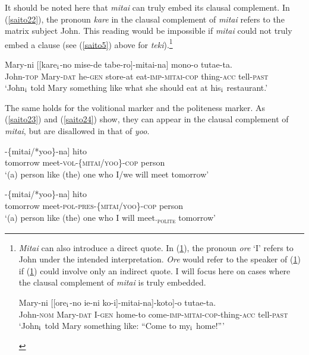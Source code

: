 \documentclass[output=paper]{langscibook}
\begin{document}
It should be noted here that \emph{mitai} can truly embed its clausal complement. In (\ref{saito22}), the pronoun \emph{kare} in the clausal complement of \emph{mitai} refers to the matrix subject John. This reading would be impossible if \emph{mitai} could not truly embed a clause  (see (\ref{saito5}) above for \emph{teki}).\footnote{\emph{Mitai} can also introduce a direct quote. In (\ref{saitoi2}), the pronoun \emph{ore} ‘I’ refers to John under the intended interpretation. \emph{Ore} would refer to the speaker of (\ref{saitoi2}) if (\ref{saitoi2}) could involve only an indirect quote. I will focus here on cases where the clausal complement of \emph{mitai} is truly embedded. 
\begin{exe}
\ex \label{saitoi2}
  {Mary-ni} [[{ore$_{\textnormal{i}}$-no} {ie-ni} {ko-i}]-{mitai-na]-koto]-o} {tutae-ta}.\\
John-\textsc{nom} Mary-\textsc{dat} I-\textsc{gen} home-to come-\textsc{imp-mitai-cop}-thing-\textsc{acc} tell-\textsc{past}\\ 
\glt ‘John$_{\textnormal{i}}$ told Mary something like: “Come to my$_{\textnormal{i}}$ home!”’

\end{exe}
}

\begin{exe}
\ex \label{saito22}
  {Mary-ni} [[{kare$_{\textnormal{i}}$-no} {mise-de} {tabe-ro}]-{mitai-na}] {mono-o} {tutae-ta}.\\
John-\textsc{top} Mary-\textsc{dat} he-\textsc{gen} store-at eat-\textsc{imp-mitai-cop} thing-\textsc{acc} tell-\textsc{past}\\ 
\glt ‘John$_{\textnormal{i}}$ told Mary something like what she should eat at his$_{\textnormal{i}}$ restaurant.’
\end{exe}

The same holds for the volitional marker and the politeness marker. As (\ref{saito23}) and (\ref{saito24}) show, they can appear in the clausal complement of \emph{mitai}, but are disallowed in that of \emph{yoo}.


\begin{exe}
\ex \label{saito23}
\gll [[{asita} {a-oo}]-\{{mitai/*yoo}\}-{na}] {hito}\\
tomorrow meet-\textsc{vol}-\{\textsc{mitai/yoo}\}-\textsc{cop} person\\ 
\glt  ‘(a) person like (the) one who I/we will meet tomorrow’

\ex \label{saito24}
\gll [[{asita} {a-mas-u}]-\{{mitai/*yoo}\}-{na}] {hito}\\
tomorrow meet-\textsc{pol-pres}-\{\textsc{mitai/yoo}\}-\textsc{cop} person\\ 
\glt ‘(a) person like (the) one who I will meet.\textsubscript{\textsc{polite}} tomorrow’
\end{exe}
\end{document}
